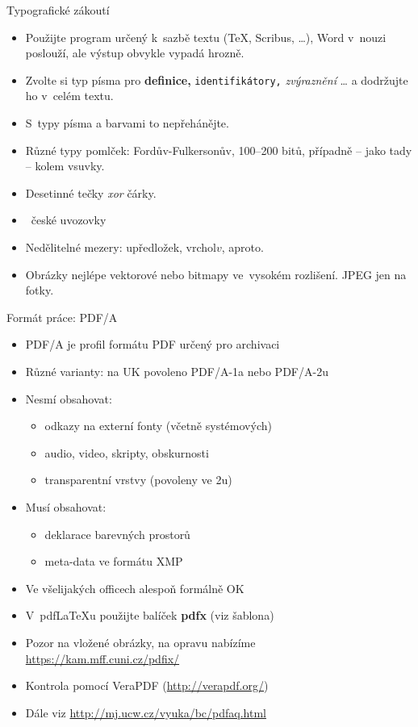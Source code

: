 \documentclass{beamer}
\begin{document}
\begin{frame}{Typografické zákoutí}

\begin{itemize}
\item Použijte program určený k~sazbě textu (\TeX, Scribus, \dots),
   Word v~nouzi poslouží, ale výstup obvykle vypadá hrozně.
\item Zvolte si typ písma pro {\bf definice,} {\tt identifikátory,} {\it zvýraznění\/} \dots{} a
   dodržujte ho v~celém textu.
\item S~typy písma a barvami to nepřehánějte.
\item Různé typy pomlček: Fordův-Fulkersonův, 100--200 bitů, případně -- jako tady -- kolem vsuvky.
\item Desetinné tečky {\it xor\/} čárky.
\item \clqq~české uvozovky \crqq
\item Nedělitelné mezery: u{\tt{}}předložek, vrchol{\tt{}}$v$, a{\tt{}}proto.
\item Obrázky nejlépe vektorové nebo bitmapy ve~vysokém rozlišení. JPEG jen na fotky.
\end{itemize}

\end{frame}

\begin{frame}{Formát práce: PDF/A}

\begin{itemize}
\item PDF/A je profil formátu PDF určený pro archivaci
\item Různé varianty: na UK povoleno PDF/A-1a nebo PDF/A-2u
\item Nesmí obsahovat:
	\begin{itemize}
	\item odkazy na externí fonty (včetně systémových)
	\item audio, video, skripty, obskurnosti
	\item transparentní vrstvy (povoleny ve 2u)
	\end{itemize}
\item Musí obsahovat:
	\begin{itemize}
	\item deklarace barevných prostorů
	\item meta-data ve formátu XMP
	\end{itemize}
\item Ve všelijakých officech alespoň formálně OK
\item V~pdf\LaTeX{}u použijte balíček {\bf pdfx} (viz šablona)
\item Pozor na vložené obrázky, na opravu nabízíme\\\url{https://kam.mff.cuni.cz/pdfix/}
\item Kontrola pomocí VeraPDF (\url{http://verapdf.org/})
\item Dále viz \url{http://mj.ucw.cz/vyuka/bc/pdfaq.html}
\end{itemize}

\end{frame}
\end{document}
